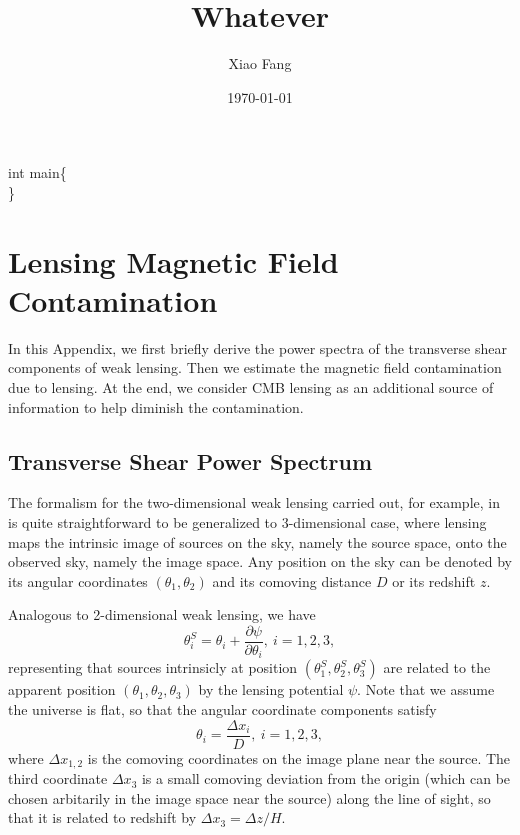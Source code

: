 \documentclass[aps,prd,twocolumn,floatfix,showpacs,superscriptaddress,nofootinbib]{revtex4-1}
\begin{document}
\title{Whatever}

\author{Xiao Fang}

\date{\today}


\maketitle

int main\{\\
\}




\newpage

\appendix
\section{Lensing Magnetic Field Contamination}
In this Appendix, we first briefly derive the power spectra of the transverse shear components of weak lensing. Then we estimate the magnetic field contamination due to lensing. At the end, we consider CMB lensing as an additional source of information to help diminish the contamination.

\subsection{Transverse Shear Power Spectrum}
The formalism for the two-dimensional weak lensing carried out, for example, in \cite{Weinberg201387} is quite straightforward to be generalized to 3-dimensional case, where lensing maps the intrinsic image of sources on the sky, namely the source space, onto the observed sky, namely the image space. Any position on the sky can be denoted by its angular coordinates $(\theta_1,\theta_2)$ and its comoving distance $D$ or its redshift $z$.

Analogous to 2-dimensional weak lensing, we have
\begin{equation}
\theta_i^S=\theta_i+\frac{\partial\psi}{\partial\theta_i},\ i=1,2,3,
\label{lensingmapping}
\end{equation}
representing  that sources intrinsicly at position $(\theta_1^S,\theta_2^S,\theta_3^S)$ are related to the apparent position $(\theta_1,\theta_2,\theta_3)$ by the lensing potential $\psi$. Note that we assume the universe is flat, so that the angular coordinate components satisfy
\begin{equation}
\theta_i=\frac{\Delta x_i}{D},\ i=1,2,3,
\end{equation}
where $\Delta x_{1,2}$ is the comoving coordinates on the image plane near the source. The third coordinate $\Delta x_3$ is a small comoving deviation from the origin (which can be chosen arbitarily in the image space near the source) along the line of sight, so that it is related to redshift by $\Delta x_3=\Delta z/H$.
\end{document}
